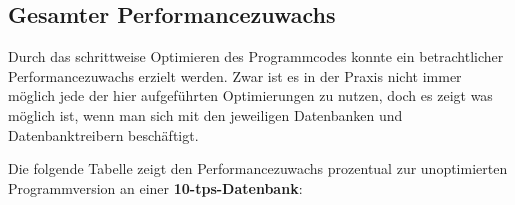 \subsection{Gesamter Performancezuwachs}
Durch das schrittweise Optimieren des Programmcodes konnte ein betrachtlicher
Performancezuwachs erzielt werden. Zwar ist es in der Praxis nicht immer möglich
jede der hier aufgeführten Optimierungen zu nutzen, doch es zeigt was möglich
ist, wenn man sich mit den jeweiligen Datenbanken und Datenbanktreibern beschäftigt.

Die folgende Tabelle zeigt den Performancezuwachs prozentual zur unoptimierten
Programmversion an einer \textbf{10-tps-Datenbank}: 



\clearpage